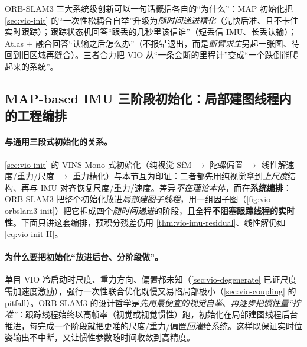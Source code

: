 \begin{insight}
ORB-SLAM3 三大系统级创新可以一句话概括各自的“为什么”：MAP 初始化把 \cref{sec:vio-init} 的“一次性松耦合自举”升级为\emph{随时间递进精化}（先快后准、且不卡住实时跟踪）；跟踪状态机回答“跟丢的几秒里该信谁”（短丢信 IMU、长丢认输）；Atlas $+$ 融合回答“认输之后怎么办”（不报错退出，而是\emph{断臂求生}另起一张图、待回到旧区域再缝合）。三者合力把 VIO 从“一条会断的里程计”变成“一个跌倒能爬起来的系统”。
\end{insight}

\subsection{MAP-based IMU 三阶段初始化：局部建图线程内的工程编排}
\label{sec:vio-orbslam3-init}

\paragraph{与通用三段式初始化的关系。}
\cref{sec:vio-init} 的 VINS-Mono 式初始化（纯视觉 SfM $\to$ 陀螺偏置 $\to$ 线性解速度/重力/尺度 $\to$ 重力精化）与本节互为印证：二者都先用纯视觉拿到\emph{上尺度}结构、再与 IMU 对齐恢复尺度/重力/速度。差异\emph{不在理论本体}，而在\textbf{系统编排}\cite{campos2021orbslam3,campos2020inertialinit}：ORB-SLAM3 把整个初始化放进\emph{局部建图子线程}，用一组因子图（\cref{fig:vio-orbslam3-init}）把它拆成四个\emph{随时间递进}的阶段，且全程\textbf{不阻塞跟踪线程的实时性}。下面只讲这套编排，预积分残差仍用 \cref{thm:vio-imu-residual}、线性解仍如 \cref{eq:vio-init-H}。

\paragraph{为什么要把初始化“放进后台、分阶段做”。}
单目 VIO 冷启动时尺度、重力方向、偏置都未知（\cref{sec:vio-degenerate} 已证尺度需加速度激励），强行一次性联合优化既慢又易陷局部极小（\cref{sec:vio-coupling} 的 pitfall）。ORB-SLAM3 的设计哲学是\emph{先用最便宜的视觉自举、再逐步把惯性量“拧准”}：跟踪线程始终以高帧率（视觉或视觉惯性）跑，初始化在局部建图线程后台推进，每完成一个阶段就把更准的尺度/重力/偏置\emph{回灌}给系统。这样既保证实时位姿输出不中断，又让惯性参数随时间收敛到高精度。


